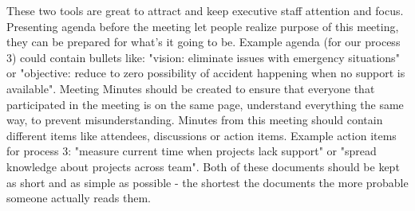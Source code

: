 \begin{itemize}
	These two tools are great to attract and keep executive staff attention and focus. Presenting agenda before the meeting let people realize purpose of this meeting, they can be prepared for what's it going to be. Example agenda (for our process 3) could contain bullets like: "vision: eliminate issues with emergency situations" or "objective: reduce to zero possibility of accident happening when no support is available". Meeting Minutes should be created to ensure that everyone that participated in the meeting is on the same page, understand everything the same way, to prevent misunderstanding. Minutes from this meeting should contain different items like attendees, discussions or action items. Example action items for process 3: "measure current time when projects lack support" or "spread knowledge about projects across team". Both of these documents should be kept as short and as simple as possible - the shortest the documents the more probable someone actually reads them.

\end{itemize}
